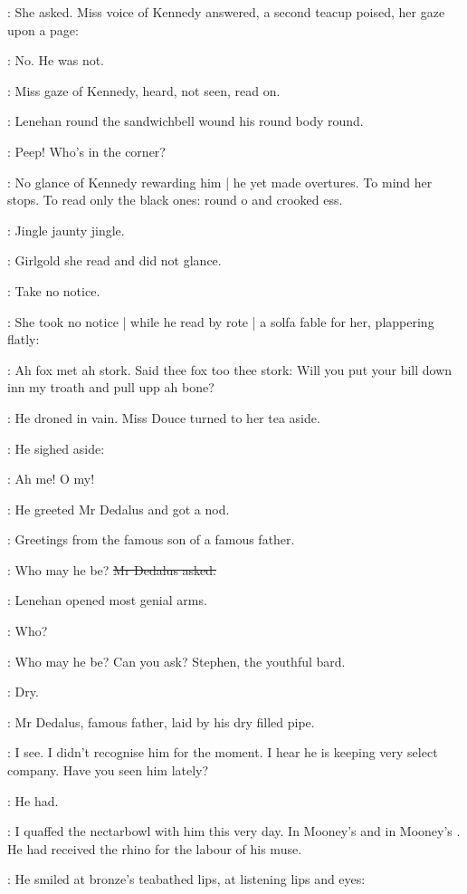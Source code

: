 :
She asked.
Miss voice of Kennedy answered,
a second teacup poised,
her gaze upon a page:

\MissK:
No.
He was not.

:
Miss gaze of Kennedy,
heard, not seen,
read on.

:
Lenehan round the sandwichbell wound his round body round.

\lenehan:
Peep!
Who's in the corner?

:
No glance of Kennedy rewarding him |
he yet made overtures.
To mind her stops.
To read only the black ones:
round o and crooked ess.

:
Jingle jaunty jingle.

:
Girlgold she read and did not glance.

\MissK:
Take no notice.

:
She took no notice |
while he read by rote |
a solfa fable for her, plappering flatly:

\lenehan:
Ah fox met ah stork.
Said thee fox too thee stork:
Will you put your bill down inn my troath and pull upp ah bone?

:
He droned in vain.
Miss Douce turned to her tea aside.

:
He sighed aside:

\lenehan:
Ah me!
O my!

:
He greeted Mr Dedalus and got a nod.

\lenehan:
Greetings from the famous son of a famous father.

\simon:
Who may he be?
\sout{Mr Dedalus asked.}

:
Lenehan opened most genial arms.

\lenehan:
Who?

\lenehan:
Who may he be?
Can you ask?
Stephen, the youthful bard.

:
Dry.

:
Mr Dedalus, famous father,
laid by his dry filled pipe.

\simon:
I see.
I didn't recognise him for the moment.
I hear he is keeping very select company.
Have you seen him lately?

:
He had.

\lenehan:
I quaffed the nectarbowl with him this very day.
In Mooney's 
and in Mooney's .
He had received the rhino for the labour of his muse.

:
He smiled at bronze's teabathed lips,
at listening lips and eyes:


